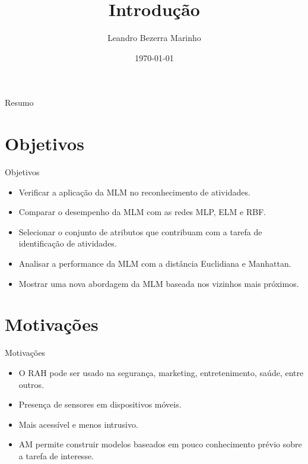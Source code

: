 \documentclass{beamer}
\begin{document}
\title[]{Introdução} %
\author[]{Leandro Bezerra Marinho} %
\date{\today} %

\begin{frame}
\titlepage
\end{frame}


\begin{frame}{Resumo}
\tableofcontents
\end{frame}


\section{Objetivos}
\begin{frame}{Objetivos}
	
	\begin{itemize}
		\item Verificar a aplicação da MLM no reconhecimento de atividades.
		\item Comparar o desempenho da MLM com as redes MLP, ELM e RBF.
		\item Selecionar o conjunto de atributos que contribuam com a tarefa de identificação de atividades.
		\item Analisar a performance da MLM com a distância Euclidiana e Manhattan.
		\item Mostrar uma nova abordagem da MLM baseada nos vizinhos mais próximos.
	\end{itemize}

\end{frame}


\section{Motivações}
\begin{frame}{Motivações}

	\begin{itemize}
		\item O RAH pode ser usado na segurança, marketing, entretenimento, saúde, entre outros.
		\item Presença de sensores em dispositivos móveis.
		\item Mais acessível e menos intrusivo.
		\item AM permite construir modelos baseados em pouco conhecimento prévio sobre a tarefa de interesse. 
	\end{itemize}
	
\end{frame}
\end{document}
